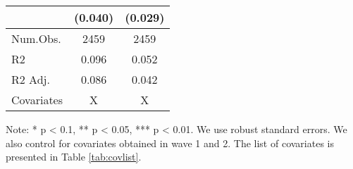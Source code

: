 \begin{table}
\begin{threeparttable}
\begin{tabular}[t]{lcc}
 & (\num{0.040}) & (\num{0.029})\\
\midrule
Num.Obs. & \num{2459} & \num{2459}\\
R2 & \num{0.096} & \num{0.052}\\
R2 Adj. & \num{0.086} & \num{0.042}\\
Covariates & X & X\\
\bottomrule
\end{tabular}
\begin{tablenotes}
\item Note: * p < 0.1, ** p < 0.05, *** p < 0.01. We use robust standard errors. We also control for covariates obtained in wave 1 and 2. The list of covariates is presented in Table \ref{tab:covlist}.
\end{tablenotes}
\end{threeparttable}
\end{table}
